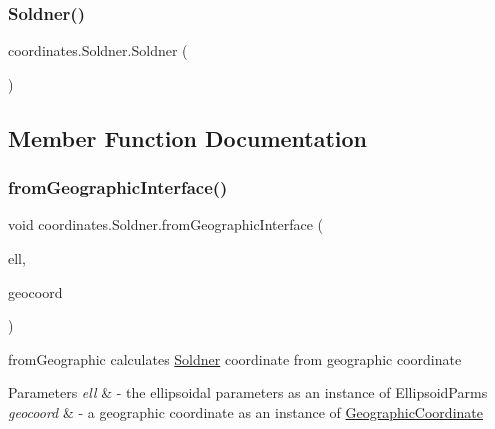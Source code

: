 \mbox{\label{classcoordinates_1_1_soldner_a01998c873e25c1fbefb3aba8d1d24cdd}} 
\subsubsection{\texorpdfstring{Soldner()}{Soldner()}\hspace{0.1cm}{\footnotesize\ttfamily [3/3]}}
{\footnotesize\ttfamily coordinates.\+Soldner.\+Soldner (\begin{DoxyParamCaption}{ }\end{DoxyParamCaption})}



\subsection{Member Function Documentation}
\mbox{\label{classcoordinates_1_1_soldner_a5199877cccd7cfc4c450364c9d36acd6}} 
\subsubsection{\texorpdfstring{from\+Geographic\+Interface()}{fromGeographicInterface()}}
{\footnotesize\ttfamily void coordinates.\+Soldner.\+from\+Geographic\+Interface (\begin{DoxyParamCaption}\item[{\hyperlink{classparams_1_1_ellipsoid_parms}{Ellipsoid\+Parms}}]{ell,  }\item[{\hyperlink{classcoordinates_1_1_geographic_coordinate_interface}{Geographic\+Coordinate\+Interface}}]{geocoord }\end{DoxyParamCaption})}



from\+Geographic calculates \hyperlink{classcoordinates_1_1_soldner}{Soldner} coordinate from geographic coordinate 


\begin{DoxyParams}{Parameters}
{\em ell} & -\/ the ellipsoidal parameters as an instance of Ellipsoid\+Parms \\
\hline
{\em geocoord} & -\/ a geographic coordinate as an instance of \hyperlink{classcoordinates_1_1_geographic_coordinate}{Geographic\+Coordinate} \\
\hline
\end{DoxyParams}
\mbox{\label{classcoordinates_1_1_soldner_a1bb5f8b49d0f2858f22028f3532d1ee3}} 

